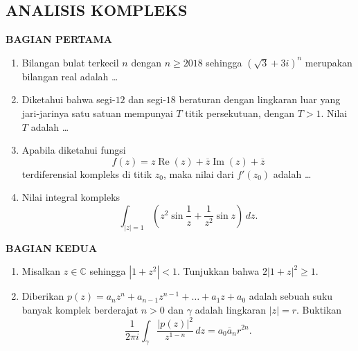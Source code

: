 \documentclass[12pt,twoside]{article}
\begin{document}
\subsection{ANALISIS KOMPLEKS}
\textbf{BAGIAN PERTAMA}
\begin{enumerate}
	\item Bilangan bulat terkecil $n$ dengan $n \geq 2018$ sehingga $(\sqrt{3}+3i)^n$ merupakan bilangan real adalah \dots

	\item Diketahui bahwa segi-$12$ dan segi-$18$ beraturan dengan lingkaran luar yang jari-jarinya satu satuan mempunyai $T$ titik persekutuan, dengan $T>1$. Nilai $T$ adalah \dots

	\item Apabila diketahui fungsi
	      \begin{equation*}
		      f(z) =z\operatorname{Re}(z) + \overline{z}\operatorname{Im}(z) + \overline{z}
	      \end{equation*}
	      terdiferensial kompleks di titik $z_0$, maka nilai dari $f'(z_0)$ adalah \dots

	\item Nilai integral kompleks
	      \begin{equation*}
		      \displaystyle\int_{|z|=1}^{} \left( z^2\sin\dfrac{1}{z} + \dfrac{1}{z^2}\sin z \right) \, dz.
	      \end{equation*}

\end{enumerate}

\newpage \textbf{BAGIAN KEDUA}
\begin{enumerate}
	\item Misalkan $z \in \mathbb{C} $ sehingga $|1+z^2|<1.$ Tunjukkan bahwa $2|1+z|^2 \geq 1.$

	\item Diberikan $p(z) = a_nz^n + a_{n-1}z^{n-1}+\dots+a_1z+a_0$ adalah sebuah suku banyak komplek berderajat $n>0$ dan $\gamma$ adalah lingkaran $|z|=r$. Buktikan
	      \begin{equation*}
		      \displaystyle\dfrac{1}{2\pi i} \int_{\gamma}^{} \dfrac{|p(z)|^2}{z^{1-n}} \, dz = a_0\overline{a}_nr^{2n}.
	      \end{equation*}
\end{enumerate}

\pagebreak
\end{document}
